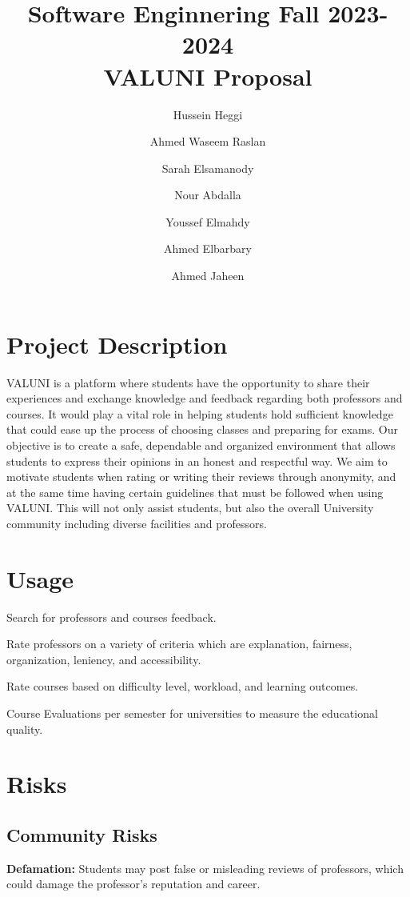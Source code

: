 \documentclass{article}
\title{Software Enginnering Fall 2023-2024 \\ VALUNI Proposal}
\author{  
Hussein Heggi 	\and
Ahmed Waseem Raslan 	\and
Sarah Elsamanody 	\and
Nour Abdalla 	\and
Youssef Elmahdy	\and
Ahmed Elbarbary	\and 
Ahmed Jaheen}
\begin{document}
\begin{titlingpage}
\maketitle
\end{titlingpage}

\break

\tableofcontents

\break

\section{Project Description}
\quad VALUNI is a platform where students have the opportunity to share their experiences and exchange knowledge and feedback regarding both professors and courses.  It would play a vital role in helping students hold sufficient knowledge that could ease up the process of choosing classes and preparing for exams. Our objective is to create a safe, dependable and organized environment that allows students to express their opinions in an honest and respectful way. We aim to motivate students when rating or writing their reviews through anonymity, and at the same time having certain guidelines that must be followed when using VALUNI. This will not only assist students, but also the overall University community including diverse facilities and professors. 

\section{Usage}
Search for professors and courses feedback.  

Rate professors on a variety of criteria which are explanation, fairness, organization, leniency, and accessibility.

Rate courses based on difficulty level, workload, and learning outcomes.

Course Evaluations per semester for universities to measure the educational quality.

\section{Risks} 

\subsection{Community Risks}
\textbf{Defamation:} Students may post false or misleading reviews of professors, which could damage the professor's reputation and career.
\end{document}
